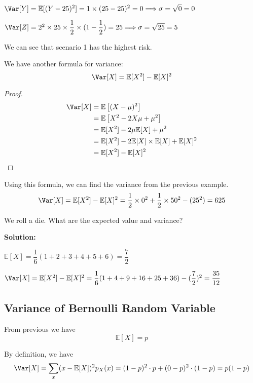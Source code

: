 \(\Var[Y] = \mathbb{E}[(Y - 25)^2] = 1 \times (25 - 25)^2 = 0 \Longrightarrow \sigma = \sqrt{0} = 0\) 

\(\Var[Z] = 2^2 \times 25 \times \dfrac{1}{2} \times (1 - \dfrac{1}{2}) = 25 \Longrightarrow \sigma = \sqrt{25} = 5\) 

We can see that scenario 1 has the highest risk. 

We have another formula for variance: 
\[
    \Var[X] = \mathbb{E}[X^2] - \mathbb{E}[X]^2
\]
\begin{proof}
    \[
        \begin{aligned}
            \Var[X] &= \mathbb{E}\left[(X - \mu)^2 \right] \\
            &= \mathbb{E}\left[X^2 -2 X \mu + \mu^2 \right] \\
            &= \mathbb{E}[X^2] -2\mu\mathbb{E}[X] + \mu^2 \\
            &= \mathbb{E}[X^2] - 2\mathbb{E}[X] \times \mathbb{E}[X] + \mathbb{E}[X]^2 \\
            &= \mathbb{E}[X^2] - \mathbb{E}[X]^2
        \end{aligned}
    \]
\end{proof}

Using this formula, we can find the variance from the previous example.
\[
\Var[X] = \mathbb{E}[X^2] - \mathbb{E}[X]^2 = \dfrac{1}{2} \times 0^2 + \dfrac{1}{2} \times 50^2 - (25^2) = 625
\] 

\begin{eg}
    We roll a die. What are the expected value and variance?

    \textbf{Solution:} 
    
    \(\mathbb{E}[X] = \dfrac{1}{6}(1 + 2 + 3 + 4 + 5 + 6) = \dfrac{7}{2}\)

    \(\Var[X] = \mathbb{E}[X^2] - \mathbb{E}[X]^2 = \dfrac{1}{6}(1 + 4 + 9 + 16 + 25 + 36) - (\dfrac{7}{2})^2 = \dfrac{35}{12}\)
\end{eg}

\subsection{Variance of Bernoulli Random Variable}
From previous we have 
\[
    \mathbb{E}[X] = p
\]

By definition, we have 
\[
    \Var[X] = \sum_{x}(x - \mathbb{E}[X])^2 p_X (x) = (1 - p)^2 \cdot p + (0 - p)^2 \cdot (1 - p) = p (1 - p)
\]

